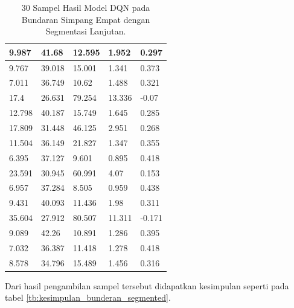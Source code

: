 \documentclass[conference]{IEEEtran}
\begin{document}
\begin{table}[H]
{\begin{tabular}{|l|l|l|l|l|}
				9.987           & 41.68      & 12.595           & 1.952           & 0.297       \\ \hline
				9.767           & 39.018     & 15.001           & 1.341           & 0.373       \\ \hline
				7.011           & 36.749     & 10.62            & 1.488           & 0.321       \\ \hline
				17.4            & 26.631     & 79.254           & 13.336          & -0.07       \\ \hline
				12.798          & 40.187     & 15.749           & 1.645           & 0.285       \\ \hline
				17.809          & 31.448     & 46.125           & 2.951           & 0.268       \\ \hline
				11.504          & 36.149     & 21.827           & 1.347           & 0.355       \\ \hline
				6.395           & 37.127     & 9.601            & 0.895           & 0.418       \\ \hline
				23.591          & 30.945     & 60.991           & 4.07            & 0.153       \\ \hline
				6.957           & 37.284     & 8.505            & 0.959           & 0.438       \\ \hline
				9.431           & 40.093     & 11.436           & 1.98            & 0.311       \\ \hline
				35.604          & 27.912     & 80.507           & 11.311          & -0.171      \\ \hline
				9.089           & 42.26      & 10.891           & 1.286           & 0.395       \\ \hline
				7.032           & 36.387     & 11.418           & 1.278           & 0.418       \\ \hline
				8.578           & 34.796     & 15.489           & 1.456           & 0.316       \\ \hline
			\end{tabular}%
		}
		\caption{30 Sampel Hasil Model DQN pada Bundaran Simpang Empat dengan Segmentasi Lanjutan.}
		\label{tb:hasilpengujian_bunderan_segmented}
	\end{table}
	
	Dari hasil pengambilan sampel tersebut didapatkan kesimpulan seperti pada tabel \ref{tb:kesimpulan_bunderan_segmented}.
	
	
	\begin{table}[H]
		\caption{Kesimpulan Hasil Model DQN pada Bundaran Simpang Empat dengan Segmentasi Lanjutan.}
		\label{tb:kesimpulan_bunderan_segmented}
	\end{table}
	
\end{document}
